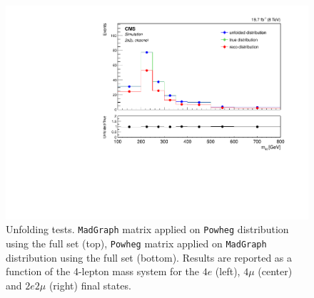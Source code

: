 \begin{figure}[hbtp]
\begin{center}
    \includegraphics[width=0.8\cmsFigWidth]{Figures/Unfolding/MCTests/Mass_ZZTo2e2m_PowMatrix_MadDistr_FullSample_fr}  
 \caption{Unfolding tests. \texttt{MadGraph} matrix applied on \texttt{Powheg} distribution using the full set (top), \texttt{Powheg} matrix applied on \texttt{MadGraph} distribution using the full set (bottom). Results are reported as a function of the 4-lepton mass system for the $4e$ (left), $4\mu$ (center) and $2e2\mu$ (right) final states.}
    \label{fig:MCtest_Mass2}
  \end{center}
\end{figure}
\clearpage
